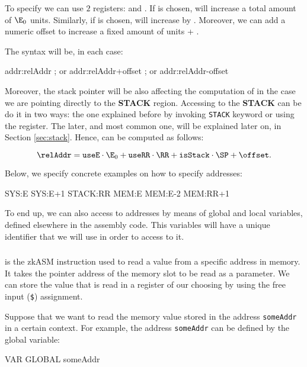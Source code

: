 To specify \relAddr we can use $2$ registers: \E and \RR. If \E is chosen, \relAddr will increase a total amount of $\E_0$ units. Similarly, if \RR is chosen, \relAddr will increase by \RR. Moreover, we can add a numeric offset to increase a fixed amount of units \addr + \relAddr. 

The syntax will be, in each case:

\begin{zkasm}
addr:relAddr 
; or
addr:relAddr+offset
; or 
addr:relAddr-offset
\end{zkasm}

Moreover, the stack pointer \SP will be also affecting the computation of \SP in the case we are pointing directly to the \textbf{STACK} region. Accessing to the \textbf{STACK} can be do it in two ways: the one explained before by invoking \texttt{STACK} keyword or using the \SP register. The later, and most common one, will be explained later on, in Section \ref{sec:stack}. Hence, \relAddr can be computed as follows:

\[
\relAddr = \texttt{useE} \cdot \E_0 + \texttt{useRR} \cdot \RR + \texttt{isStack} \cdot \SP + \offset.
\]

Below, we specify concrete examples on how to specify addresses:

\begin{zkasm}
SYS:E
SYS:E+1
STACK:RR
MEM:E 
MEM:E-2
MEM:RR+1
\end{zkasm}

To end up, we can also access to addresses by means of global and local variables, defined elsewhere in the assembly code. This variables will have a unique identifier that we will use in order to access to it.


\subsubsection{\MLOAD}


\MLOAD is the zkASM instruction used to read a value from a specific address in memory. It takes the pointer address of the memory slot to be read as a parameter. We can store the value that is read in a register of our choosing by using the free input (\texttt{\$}) assignment. 

Suppose that we want to read the memory value stored in the address \texttt{someAddr} in a certain context. For example, the address \texttt{someAddr} can be defined by the global variable:
\begin{zkasm}
VAR GLOBAL someAddr
\end{zkasm}

